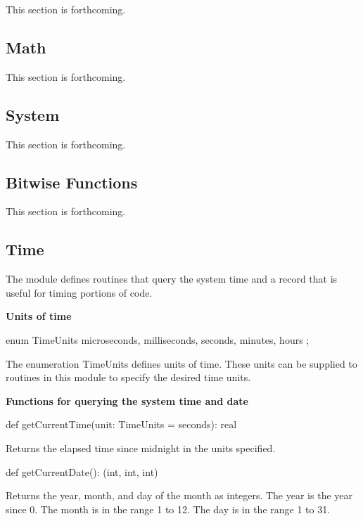 \label{Standard_Modules}

This section is forthcoming.

\subsection{Math}
\label{Math}

This section is forthcoming.

\subsection{System}
\label{System}

This section is forthcoming.

\subsection{Bitwise Functions}
\label{Bitwise_Functions}

This section is forthcoming.

\subsection{Time}
\label{Time}

The module  defines routines that query the system time and
a record  that is useful for timing portions of code.

{\bf Units of time}

\begin{chapel}
enum TimeUnits { microseconds, milliseconds, seconds, minutes, hours };
\end{chapel}
The enumeration TimeUnits defines units of time.  These units can be
supplied to routines in this module to specify the desired time units.

{\bf Functions for querying the system time and date}

\begin{chapel}
def getCurrentTime(unit: TimeUnits = seconds): real
\end{chapel}
Returns the elapsed time since midnight in the units specified.

\begin{chapel}
def getCurrentDate(): (int, int, int)
\end{chapel}
Returns the year, month, and day of the month as integers.  The year
is the year since 0.  The month is in the range 1 to 12.  The day is
in the range 1 to 31.

